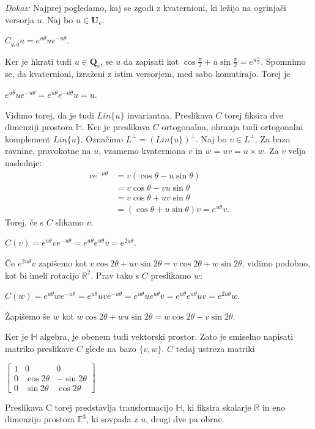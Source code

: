 \documentclass[a4paper,12pt]{article}
\def\R{\mathbb{R}} %
\def\H{\mathbb{H}} %
\def\Qe{\textbf{Q}_{e}} %
\def\Ue{\textbf{U}_{e}} %
\newcommand{\conj}[1]{\overline{#1}}
\begin{document}
\noindent
{\em Dokaz:\/} Najprej pogledamo, kaj se zgodi z kvaternioni, ki ležijo na ogrinjači versorja $u$.
Naj bo $u \in \Ue$.
\begin{center}
   $C_{q,\conj{q}}u = e^{u\theta} u e^{-u\theta}$.
\end{center}
Ker je hkrati tudi $u \in \Qe$, se $u$ da zapisati kot $\cos\frac{\pi}{2} + u\sin\frac{\pi}{2} = e^{u\frac{\pi}{2}}$.
Spomnimo se, da kvaternioni, izraženi z istim versorjem, med sabo komutirajo. Torej je
\begin{center}
   $e^{u\theta} u e^{-u\theta} = e^{u\theta}e^{-u\theta}u = u$.
\end{center}
Vidimo torej, da je tudi $Lin\{u\}$ invariantna. Preslikava $C$ torej fiksira dve dimenziji prostora $\H$.
Ker je preslikava $C$ ortogonalna, ohranja tudi ortogonalni komplement $Lin\{u\}$.
Označimo $L^{\bot} = (Lin\{u\})^{\bot}$. Naj bo $v \in L^{\bot}$. Za bazo ravnine, pravokotne na $u$, vzamemo kvaterniona $v$ in $w = uv = u \times w$.
Za $v$ velja naslednje:
\begin{align*}
   v e^{-u\theta} & = v(\cos\theta -u\sin\theta) \\
   & = v\cos\theta -vu \sin\theta \\
   & = v\cos\theta + uv\sin\theta \\
   & = (\cos\theta +u\sin\theta)v = e^{u\theta}v.
\end{align*}
Torej, če s $C$ slikamo $v$:
\begin{center}
   $C(v) = e^{u\theta}v e^{-u\theta} = e^{u\theta}e^{u\theta}v = e^{2u\theta}$.
\end{center}
Če $e^{2u\theta}v$ zapišemo kot $v\cos2\theta + uv\sin2\theta = v\cos2\theta + w\sin2\theta$, vidimo podobno, kot bi imeli rotacijo $\R^2$. Prav tako s $C$ preslikamo $w$:
\begin{center}
   $C(w) = e^{u\theta}w e^{-u\theta} = e^{u\theta}uve^{-u\theta} = e^{u\theta}ue^{u\theta}v = e^{u\theta}e^{u\theta}uv = e^{2u\theta}w$.
\end{center}
Žapišemo še $w$ kot $w\cos2\theta + wu\sin2\theta = w\cos2\theta - v\sin2\theta$.

Ker je $\H$ algebra, je obenem tudi vektorski prostor. Zato je smiselno napisati matriko preslikave $C$ glede na bazo $\{v, w\}$.
$C$ tedaj ustreza matriki
\begin{center}
   $
   \begin{bmatrix}
      1 & 0 & 0 \\
      0 & \cos2\theta & -\sin2\theta \\
      0 & \sin2\theta & \cos2\theta
   \end{bmatrix}
   $
\end{center}
Preslikava C torej predstavlja transformacijo $\H$, ki fiksira skalarje $\R$ in eno dimenzijo prostora $\mathbb{E}^3$, ki sovpada z $u$, drugi dve pa obrne.
\end{document}
